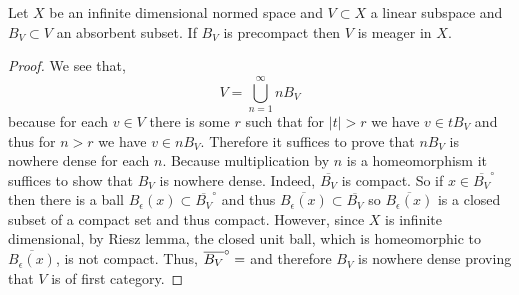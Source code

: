 \documentclass[12pt]{article}
\begin{document}
\begin{lemma}
Let $X$ be an infinite dimensional normed space and $V \subset X$ a linear subspace and $B_V \subset V$ an absorbent subset. If $B_V$ is precompact then $V$ is meager in $X$.
\end{lemma}

\begin{proof}
We see that,
\[ V = \bigcup_{n = 1}^\infty n B_V \]
because for each $v \in V$ there is some $r$ such that for $|t| > r$ we have $v \in t B_V$ and thus for $n > r$ we have $v \in n B_V$.
Therefore it suffices to prove that $n B_V$ is nowhere dense for each $n$. Because multiplication by $n$ is a homeomorphism it suffices to show that $B_V$ is nowhere dense. Indeed, $\overline{B_V}$ is compact. So if $x \in \overline{B_V}^\circ$ then there is a ball $B_\epsilon(x) \subset \overline{B_V}^\circ$ and thus $\overline{B_\epsilon(x)} \subset \overline{B_V}$ so $\overline{B_\epsilon(x)}$ is a closed subset of a compact set and thus compact. However, since $X$ is infinite dimensional, by Riesz lemma, the closed unit ball, which is homeomorphic to $\overline{B_\epsilon(x)}$, is not compact. Thus, $\overline{B_V}^\circ = \empty$ and therefore $B_V$ is nowhere dense proving that $V$ is of first category.
\end{proof}
\end{document}
